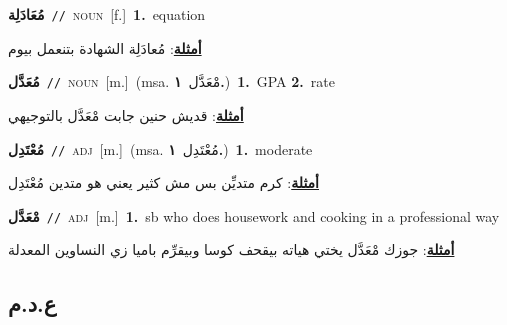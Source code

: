 \documentclass[10pt,a4paper,twoside]{article} %
\begin{document}
\begin{multicols}{2}
{\setlength\topsep{0pt}\textbf{\foreignlanguage{arabic}{مُعَادَلِة}}\ {\color{gray}\texttt{//}\color{black}}\ \textsc{noun}\ [f.]\ \textbf{1.}~equation\  \begin{flushright}\color{gray}\foreignlanguage{arabic}{\textbf{\underline{\foreignlanguage{arabic}{أمثلة}}}: مُعادَلِة الشهادة بتنعمل بيوم}\end{flushright}\color{black}} \vspace{2mm}

{\setlength\topsep{0pt}\textbf{\foreignlanguage{arabic}{مُعَدَّل}}\ {\color{gray}\texttt{//}\color{black}}\ \textsc{noun}\ [m.]\ \color{gray}(msa. \foreignlanguage{arabic}{مْعَدَّل}~\foreignlanguage{arabic}{\textbf{١.}})\color{black}\ \textbf{1.}~GPA  \textbf{2.}~rate\  \begin{flushright}\color{gray}\foreignlanguage{arabic}{\textbf{\underline{\foreignlanguage{arabic}{أمثلة}}}: قديش حنين جابت مْعَدَّل بالتوجيهي}\end{flushright}\color{black}} \vspace{2mm}

{\setlength\topsep{0pt}\textbf{\foreignlanguage{arabic}{مُعْتَدِل}}\ {\color{gray}\texttt{//}\color{black}}\ \textsc{adj}\ [m.]\ \color{gray}(msa. \foreignlanguage{arabic}{مُعْتَدِل}~\foreignlanguage{arabic}{\textbf{١.}})\color{black}\ \textbf{1.}~moderate\  \begin{flushright}\color{gray}\foreignlanguage{arabic}{\textbf{\underline{\foreignlanguage{arabic}{أمثلة}}}: كرم متديِّن بس مش كثير يعني هو متدين مُعْتَدِل}\end{flushright}\color{black}} \vspace{2mm}

{\setlength\topsep{0pt}\textbf{\foreignlanguage{arabic}{مْعَدَّل}}\ {\color{gray}\texttt{//}\color{black}}\ \textsc{adj}\ [m.]\ \textbf{1.}~sb who does housework and cooking in a professional way\  \begin{flushright}\color{gray}\foreignlanguage{arabic}{\textbf{\underline{\foreignlanguage{arabic}{أمثلة}}}: جوزك مْعَدَّل يختي هياته بيقحف كوسا وبيقرِّم باميا زي النساوين المعدلة}\end{flushright}\color{black}} \vspace{2mm}

\vspace{-3mm}
\subsection*{\color{blue}\foreignlanguage{arabic}{ع.د.م}\color{blue}{}} 


\end{multicols}
\end{document}
